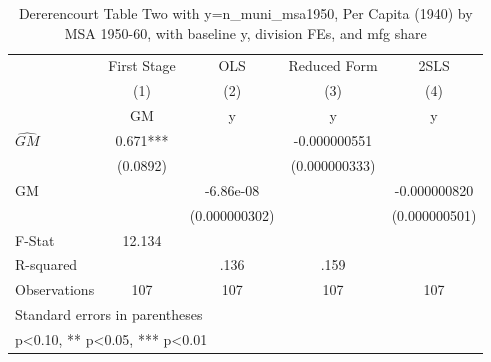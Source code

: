 \begin{table}[htbp]\centering
\def\sym#1{\ifmmode^{#1}\else\(^{#1}\)\fi}
\caption{Dererencourt Table Two with y=n\_muni\_msa1950, Per Capita (1940) by MSA 1950-60, with baseline y, division FEs, and mfg share}
\begin{tabular}{l*{4}{c}}
\toprule
                    & First Stage   &         OLS   &Reduced Form   &        2SLS   \\
                    &\multicolumn{1}{c}{(1)}&\multicolumn{1}{c}{(2)}&\multicolumn{1}{c}{(3)}&\multicolumn{1}{c}{(4)}\\
                    &\multicolumn{1}{c}{GM}&\multicolumn{1}{c}{y}&\multicolumn{1}{c}{y}&\multicolumn{1}{c}{y}\\
\midrule
$\hat{GM}$          &       0.671***&               &-0.000000551   &               \\
                    &    (0.0892)   &               &(0.000000333)   &               \\
\addlinespace
GM                  &               &   -6.86e-08   &               &-0.000000820   \\
                    &               &(0.000000302)   &               &(0.000000501)   \\
\midrule
F-Stat              &      12.134   &               &               &               \\
R-squared           &               &        .136   &        .159   &               \\
Observations        &         107   &         107   &         107   &         107   \\
\bottomrule
\multicolumn{5}{l}{\footnotesize Standard errors in parentheses}\\
\multicolumn{5}{l}{\footnotesize * p<0.10, ** p<0.05, *** p<0.01}\\
\end{tabular}
\end{table}

